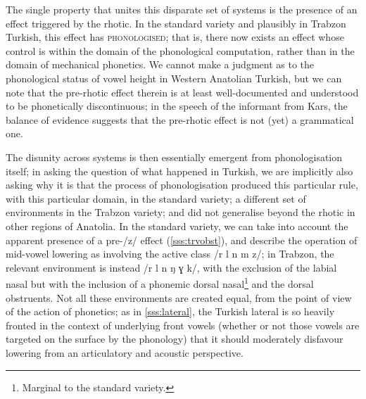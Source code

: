 The single property that unites this disparate set of systems is the presence of an effect triggered by the rhotic. In the standard variety and plausibly in Trabzon Turkish, this effect has \textsc{phonologised}; that is, there now exists an effect whose control is within the domain of the phonological computation, rather than in the domain of mechanical phonetics. We cannot make a judgment as to the phonological status of vowel height in Western Anatolian Turkish, but we can note that the pre-rhotic effect therein is at least well-documented and understood to be phonetically discontinuous; in the speech of the informant from Kars, the balance of evidence suggests that the pre-rhotic effect is not (yet) a grammatical one.

The disunity across systems is then essentially emergent from phonologisation itself; in asking the question of what happened in Turkish, we are implicitly also asking why it is that the process of phonologisation produced this particular rule, with this particular domain, in the standard variety; a different set of environments in the Trabzon variety; and did not generalise beyond the rhotic in other regions of Anatolia. In the standard variety, we can take into account the apparent presence of a pre-/z/ effect (\cref{sss:trvobst}), and describe the operation of mid-vowel lowering as involving the active class /r l n m z/; in Trabzon, the relevant environment is instead /r l n ŋ ɣ k/, with the exclusion of the labial nasal but with the inclusion of a phonemic dorsal nasal\footnote{Marginal to the standard variety.} and the dorsal obstruents. Not all these environments are created equal, from the point of view of the action of phonetics; as in \cref{sss:lateral}, the Turkish lateral is so heavily fronted in the context of underlying front vowels (whether or not those vowels are targeted on the surface by the phonology) that it should moderately disfavour lowering from an articulatory and acoustic perspective.

